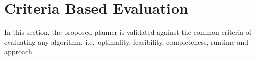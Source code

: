  




\section{Criteria Based Evaluation}
\label{criteria_based_eval}
In this section, the proposed planner is validated against the common criteria of evaluating any algorithm, i.e.\ optimality, feasibility, completeness, runtime and approach.

